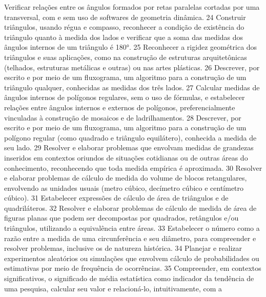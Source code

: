 {{{{{							Verificar relações entre os ângulos formados por retas paralelas cortadas por uma
							transversal, com e sem uso de softwares de geometria dinâmica.
						}
						{24}{%
							Construir triângulos, usando régua e compasso, reconhecer a condição de
							existência do triângulo quanto à medida dos lados e verificar que a soma das medidas dos
							ângulos internos de um triângulo é 180°.
						}
						{25}{%
							Reconhecer a rigidez geométrica dos triângulos e suas aplicações, como na construção
							de estruturas arquitetônicas (telhados, estruturas metálicas e outras) ou nas artes plásticas.
						}
						{26}{%
							Descrever, por escrito e por meio de um fluxograma, um algoritmo para a construção de
							um triângulo qualquer, conhecidas as medidas dos três lados.
						}
						{27}{%
							Calcular medidas de ângulos internos de polígonos regulares, sem o uso
							de fórmulas, e estabelecer relações entre ângulos internos e externos de polígonos,
							preferencialmente vinculadas à construção de mosaicos e de ladrilhamentos.
						}
						{28}{%
							Descrever, por escrito e por meio de um fluxograma, um algoritmo para a
							construção de um polígono regular (como quadrado e triângulo equilátero), conhecida a
							medida de seu lado.
						}
						{29}{%
							Resolver e elaborar problemas que envolvam medidas de grandezas inseridos em
							contextos oriundos de situações cotidianas ou de outras áreas do conhecimento, reconhecendo
							que toda medida empírica é aproximada.
						}
						{30}{%
							Resolver e elaborar problemas de cálculo de medida do volume de blocos retangulares,
							envolvendo as unidades usuais (metro cúbico, decímetro cúbico e centímetro cúbico).
						}
						{31}{%
							Estabelecer expressões de cálculo de área de triângulos e de quadriláteros.
						}
						{32}{%
							Resolver e elaborar problemas de cálculo de medida de área de figuras planas que
							podem ser decompostas por quadrados, retângulos e/ou triângulos, utilizando a equivalência
							entre áreas.
						}
						{33}{%
							Estabelecer o número como a razão entre a medida de uma circunferência e seu
							diâmetro, para compreender e resolver problemas, inclusive os de natureza histórica.
						}
						{34}{%
							Planejar e realizar experimentos aleatórios ou simulações que envolvem cálculo de
							probabilidades ou estimativas por meio de frequência de ocorrências.
						}
						{35}{%
							Compreender, em contextos significativos, o significado de média estatística como
							indicador da tendência de uma pesquisa, calcular seu valor e relacioná-lo, intuitivamente, com a
}}}}}
